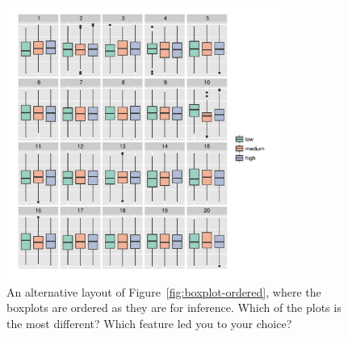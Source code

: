 \documentclass[12pt]{article} %
\begin{document}
\begin{figure}[h]
	\centering
	\includegraphics[width=0.8\textwidth]{autism2-unordered-10.pdf}
	\caption{\label{fig:boxplot-unordered} An alternative layout of Figure~\ref{fig:boxplot-ordered}, where the boxplots are ordered as they are for inference. Which of the plots is the most different? Which feature led you to your choice?}
\end{figure}

\clearpage



\end{document}
